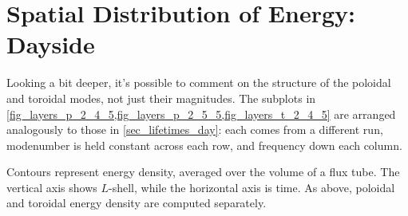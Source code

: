 

\section{Spatial Distribution of Energy: Dayside}
  \label{sec_layers_day}

Looking a bit deeper, it's possible to comment on the structure of the poloidal and toroidal modes, not just their magnitudes. The subplots in \cref{fig_layers_p_2_4_5,fig_layers_p_2_5_5,fig_layers_t_2_4_5} are arranged analogously to those in \cref{sec_lifetimes_day}: each comes from a different run, modenumber is held constant across each row, and frequency down each column. 

Contours represent energy density, averaged over the volume of a flux tube. The vertical axis shows $L$-shell, while the horizontal axis is time. As above, poloidal and toroidal energy density are computed separately. 

